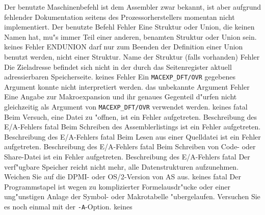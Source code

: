 \documentclass[12pt,a4paper,twoside]{report}
\newcommand{\tty}[1]{{\tt #1}}
\begin{document}
\begin{description}
               {Der benutzte Maschinenbefehl ist dem Assembler
                zwar bekannt, ist aber aufgrund fehlender
                Dokumentation seitens des Prozessorherstellers
                momentan nicht implementiert.}
               {Der benutzte Befehl}
               {Fehler}
               {Eine Struktur oder Union, die keinen Namen hat, mu"s
                immer Teil einer anderen, benamten Struktur oder Union
                sein.}
               {keines}
               {Fehler}
               {ENDUNION darf nur zum Beenden der Definition einer
                Union benutzt werden, nicht einer Struktur.}
               {Name der Struktur (falls vorhanden)}
               {Fehler}
               {Die Zieladresse befindet sich nicht in der durch
                das Seitenregister aktuell adressierbaren
                Speicherseite.}
               {keines}
               {Fehler}
               {Ein \tty{MACEXP\_DFT/OVR} gegebenes Argument konnte nicht
                interpretiert werden.}
               {das unbekannte Argument}
               {Fehler}
               {Eine Angabe zur Makroexpansion und ihr genaues
                Gegenteil d"urfen nicht gleichzeitig als Argument
                von \tty{MACEXP\_DFT/OVR} verwendet werden.}
               {keines}
               {fatal}
               {Beim Versuch, eine Datei zu "offnen, ist ein
                Fehler aufgetreten.}
               {Beschreibung des E/A-Fehlers}
               {fatal}
               {Beim Schreiben des Assemblerlistings ist ein
                Fehler aufgetreten.}
               {Beschreibung des E/A-Fehlers}
               {fatal}
               {Beim Lesen aus einer Quelldatei ist ein
                Fehler aufgetreten.}
               {Beschreibung des E/A-Fehlers}
               {fatal}
               {Beim Schreiben von Code- oder Share-Datei
                ist ein Fehler aufgetreten.}
               {Beschreibung des E/A-Fehlers}
               {fatal}
               {Der verf"ugbare Speicher reicht nicht mehr,
	        alle Datenstrukturen aufzunehmen.  Weichen Sie auf die
	        DPMI- oder OS/2-Version von AS aus.}
               {keines}
               {fatal}
               {Der Programmstapel ist wegen zu komplizierter
	        Formelausdr"ucke oder einer ung"unstigen Anlage der Symbol-
	        oder Makrotabelle "ubergelaufen.  Versuchen Sie es noch
	        einmal mit der \tty{-A}-Option.}
               {keines}
\end{description}
\end{document}
